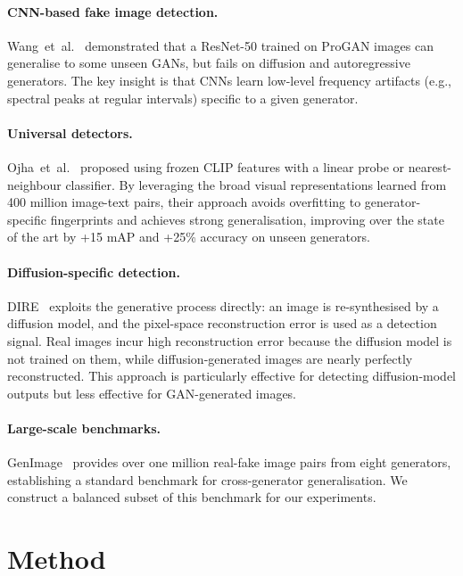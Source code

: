 \documentclass{article}
\begin{document}
\paragraph{CNN-based fake image detection.}
Wang~et~al.~\cite{wang2020cnn} demonstrated that a ResNet-50 trained on ProGAN images can generalise to some unseen GANs, but fails on diffusion and autoregressive generators.
The key insight is that CNNs learn low-level frequency artifacts (e.g., spectral peaks at regular intervals) specific to a given generator.

\paragraph{Universal detectors.}
Ojha~et~al.~\cite{ojha2023towards} proposed using frozen CLIP features with a linear probe or nearest-neighbour classifier.
By leveraging the broad visual representations learned from 400 million image-text pairs, their approach avoids overfitting to generator-specific fingerprints and achieves strong generalisation, improving over the state of the art by +15 mAP and +25\% accuracy on unseen generators.

\paragraph{Diffusion-specific detection.}
DIRE~\cite{wang2023dire} exploits the generative process directly: an image is re-synthesised by a diffusion model, and the pixel-space reconstruction error is used as a detection signal.
Real images incur high reconstruction error because the diffusion model is not trained on them, while diffusion-generated images are nearly perfectly reconstructed.
This approach is particularly effective for detecting diffusion-model outputs but less effective for GAN-generated images.

\paragraph{Large-scale benchmarks.}
GenImage~\cite{zhu2023genimage} provides over one million real-fake image pairs from eight generators, establishing a standard benchmark for cross-generator generalisation.
We construct a balanced subset of this benchmark for our experiments.


\section{Method}
\end{document}
